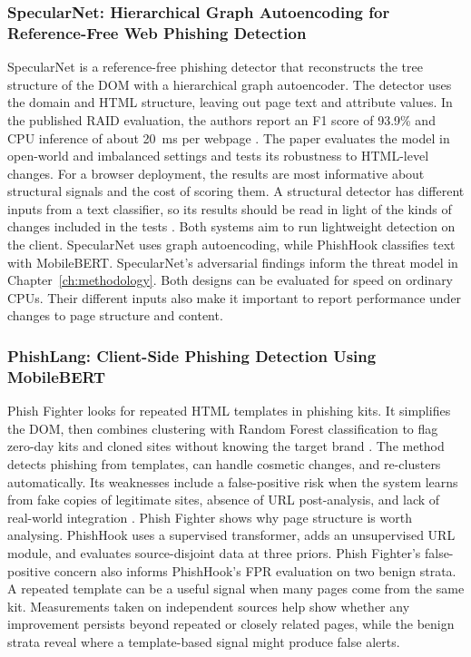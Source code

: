 \documentclass{FastFyp}
\begin{document}
\subsubsection{SpecularNet: Hierarchical Graph Autoencoding for Reference-Free Web Phishing Detection}
SpecularNet is a reference-free phishing detector that reconstructs the tree structure of the DOM with a hierarchical graph autoencoder. The detector uses the domain and HTML structure, leaving out page text and attribute values. In the published RAID evaluation, the authors report an F1 score of 93.9\% and CPU inference of about 20~ms per webpage \cite{specularnet2026}. The paper evaluates the model in open-world and imbalanced settings and tests its robustness to HTML-level changes. For a browser deployment, the results are most informative about structural signals and the cost of scoring them. A structural detector has different inputs from a text classifier, so its results should be read in light of the kinds of changes included in the tests \cite{specularnet2026}. Both systems aim to run lightweight detection on the client. SpecularNet uses graph autoencoding, while PhishHook classifies text with MobileBERT. SpecularNet's adversarial findings inform the threat model in Chapter~\ref{ch:methodology}. Both designs can be evaluated for speed on ordinary CPUs. Their different inputs also make it important to report performance under changes to page structure and content.

\subsubsection{PhishLang: Client-Side Phishing Detection Using MobileBERT}
Phish Fighter looks for repeated HTML templates in phishing kits. It simplifies the DOM, then combines clustering with Random Forest classification to flag zero-day kits and cloned sites without knowing the target brand \cite{phishfighter2025}. The method detects phishing from templates, can handle cosmetic changes, and re-clusters automatically. Its weaknesses include a false-positive risk when the system learns from fake copies of legitimate sites, absence of URL post-analysis, and lack of real-world integration \cite{phishfighter2025}. Phish Fighter shows why page structure is worth analysing. PhishHook uses a supervised transformer, adds an unsupervised URL module, and evaluates source-disjoint data at three priors. Phish Fighter's false-positive concern also informs PhishHook's FPR evaluation on two benign strata. A repeated template can be a useful signal when many pages come from the same kit. Measurements taken on independent sources help show whether any improvement persists beyond repeated or closely related pages, while the benign strata reveal where a template-based signal might produce false alerts.
\end{document}

